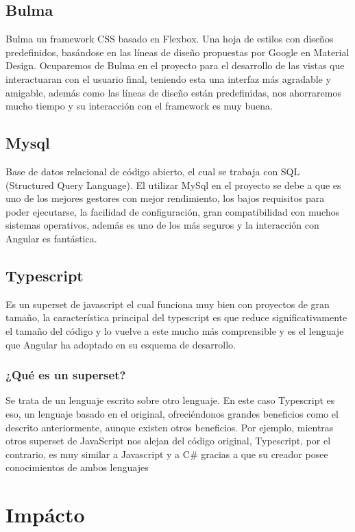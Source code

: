 \subsection{Bulma}
Bulma un framework CSS basado en Flexbox. Una hoja de estilos con diseños predefinidos, basándose en las líneas de diseño propuestas por Google en Material Design.
Ocuparemos de Bulma en el proyecto para el desarrollo de las vistas que interactuaran con el usuario final, teniendo esta una interfaz más agradable y amigable, además como las líneas de diseño están predefinidas, nos ahorraremos mucho tiempo y su interacción con el framework es muy buena. \cite{Bulma}

\subsection{ Mysql}
Base de datos relacional de código abierto, el cual se trabaja con SQL (Structured Query Language).
El utilizar MySql en el proyecto se debe a que es uno de los mejores gestores con mejor rendimiento, los bajos requisitos para poder ejecutarse, la facilidad de configuración, gran compatibilidad con muchos sistemas operativos, además es uno de los más seguros y la interacción con Angular es fantástica. \cite{mysql}

\subsection{Typescript}
Es un superset de javascript el cual funciona muy bien con proyectos de gran tamaño, la característica principal del typescript es que reduce significativamente el tamaño del código y lo vuelve a este mucho más comprensible y es el lenguaje que Angular ha adoptado en su esquema de desarrollo.
\subsubsection{¿Qué es un superset?}

Se trata de un lenguaje escrito sobre otro lenguaje. En este caso Typescript es eso, un lenguaje basado en el original, ofreciéndonos grandes beneficios como el descrito anteriormente, aunque existen otros beneficios. Por ejemplo, mientras otros superset de JavaScript nos alejan del código original, Typescript, por el contrario, es muy similar a Javascript y a C# gracias a que su creador posee conocimientos de ambos lenguajes \cite{typeScript}

\section{Impácto}
